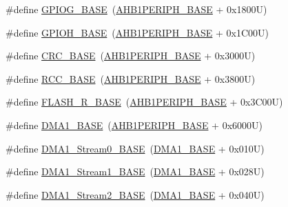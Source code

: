 \begin{DoxyCompactItemize}
\item 
\#define \hyperlink{group___peripheral__memory__map_ga5d8ca4020f2e8c00bde974e8e7c13cfe}{G\+P\+I\+O\+G\+\_\+\+B\+A\+SE}~(\hyperlink{group___peripheral__memory__map_ga811a9a4ca17f0a50354a9169541d56c4}{A\+H\+B1\+P\+E\+R\+I\+P\+H\+\_\+\+B\+A\+SE} + 0x1800\+U)
\item 
\#define \hyperlink{group___peripheral__memory__map_gaee4716389f3a1c727495375b76645608}{G\+P\+I\+O\+H\+\_\+\+B\+A\+SE}~(\hyperlink{group___peripheral__memory__map_ga811a9a4ca17f0a50354a9169541d56c4}{A\+H\+B1\+P\+E\+R\+I\+P\+H\+\_\+\+B\+A\+SE} + 0x1\+C00\+U)
\item 
\#define \hyperlink{group___peripheral__memory__map_ga656a447589e785594cbf2f45c835ad7e}{C\+R\+C\+\_\+\+B\+A\+SE}~(\hyperlink{group___peripheral__memory__map_ga811a9a4ca17f0a50354a9169541d56c4}{A\+H\+B1\+P\+E\+R\+I\+P\+H\+\_\+\+B\+A\+SE} + 0x3000\+U)
\item 
\#define \hyperlink{group___peripheral__memory__map_ga0e681b03f364532055d88f63fec0d99d}{R\+C\+C\+\_\+\+B\+A\+SE}~(\hyperlink{group___peripheral__memory__map_ga811a9a4ca17f0a50354a9169541d56c4}{A\+H\+B1\+P\+E\+R\+I\+P\+H\+\_\+\+B\+A\+SE} + 0x3800\+U)
\item 
\#define \hyperlink{group___peripheral__memory__map_ga8e21f4845015730c5731763169ec0e9b}{F\+L\+A\+S\+H\+\_\+\+R\+\_\+\+B\+A\+SE}~(\hyperlink{group___peripheral__memory__map_ga811a9a4ca17f0a50354a9169541d56c4}{A\+H\+B1\+P\+E\+R\+I\+P\+H\+\_\+\+B\+A\+SE} + 0x3\+C00\+U)
\item 
\#define \hyperlink{group___peripheral__memory__map_gab2d8a917a0e4ea99a22ac6ebf279bc72}{D\+M\+A1\+\_\+\+B\+A\+SE}~(\hyperlink{group___peripheral__memory__map_ga811a9a4ca17f0a50354a9169541d56c4}{A\+H\+B1\+P\+E\+R\+I\+P\+H\+\_\+\+B\+A\+SE} + 0x6000\+U)
\item 
\#define \hyperlink{group___peripheral__memory__map_ga0d3c52aa35dcc68f78b704dfde57ba95}{D\+M\+A1\+\_\+\+Stream0\+\_\+\+B\+A\+SE}~(\hyperlink{group___peripheral__memory__map_gab2d8a917a0e4ea99a22ac6ebf279bc72}{D\+M\+A1\+\_\+\+B\+A\+SE} + 0x010\+U)
\item 
\#define \hyperlink{group___peripheral__memory__map_ga5b4152cef577e37eccc9311d8bdbf3c2}{D\+M\+A1\+\_\+\+Stream1\+\_\+\+B\+A\+SE}~(\hyperlink{group___peripheral__memory__map_gab2d8a917a0e4ea99a22ac6ebf279bc72}{D\+M\+A1\+\_\+\+B\+A\+SE} + 0x028\+U)
\item 
\#define \hyperlink{group___peripheral__memory__map_ga48a551ee91d3f07dd74347fdb35c703d}{D\+M\+A1\+\_\+\+Stream2\+\_\+\+B\+A\+SE}~(\hyperlink{group___peripheral__memory__map_gab2d8a917a0e4ea99a22ac6ebf279bc72}{D\+M\+A1\+\_\+\+B\+A\+SE} + 0x040\+U)

\end{DoxyCompactItemize}

